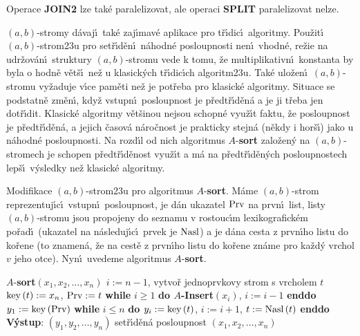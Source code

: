 \flushpar Operace {\bf JOIN2} lze tak\'e paralelizovat, ale operaci {\bf SPLIT  }
paralelizovat nelze.
\medskip

\flushpar$\left(a,b\right)$-stromy d\'avaj\'\i\ tak\'e zaj\'\i mav\'e aplikace pro 
t\v r\'\i dic\'\i\ 
algoritmy. Pou\v zit\'\i\ $\left(a,b\right)$-strom\accent23u pro set\v r\'\i d\v en\'\i\ 
n\'ahodn\'e posloupnosti nen\'\i\ vhodn\'e, re\v zie na udr\v zov\'an\'\i\ 
struktury $\left(a,b\right)$-stromu vede k tomu, \v ze multiplikativn\'\i\ 
konstanta by byla o hodn\v e v\v et\v s\'\i\ ne\v z u klasick\'ych 
t\v r\'\i dic\'\i ch algoritm\accent23u. Tak\'e ulo\v zen\'\i\ $\left(
a,b\right)$-stromu 
vy\v zaduje v\'\i ce pam\v eti ne\v z je pot\v reba pro klasick\'e 
algoritmy. Situace se podstatn\v e zm\v en\'\i , kdy\v z vstupn\'\i\ 
posloupnost je p\v red\-t\v r\'\i\-d\v en\'a a je ji t\v reba jen dot\v r\'\i dit. 
Klasick\'e algoritmy v\v et\v sinou nejsou schopn\'e vyu\v z\'\i t faktu, \v ze 
posloupnost je p\v redt\v r\'\i d\v en\'a, a jejich \v casov\'a n\'aro\v cnost je 
prakticky stejn\'a (n\v ekdy i hor\v s\'\i ) jako u n\'ahodn\'e 
posloupnosti. Na rozd\'\i l od nich algoritmus $A$-{\bf sort }
zalo\v zen\'y na $\left(a,b\right)$-stromech je schopen p\v redt\v r\'\i d\v enost 
vyu\v z\'\i t a m\'a na p\v redt\v r\'\i d\v en\'ych posloupnostech lep\v s\'\i\ 
v\'ysledky ne\v z klasick\'e algoritmy.
\medskip

\flushpar Modifikace $\left(a,b\right)$-strom\accent23u pro algoritmus 
$A$-{\bf sort}. M\'ame $\left(a,b\right)$-strom reprezentuj\'\i c\'\i\ vstupn\'\i\ 
posloupnost, je d\'an ukazatel $\operatorname{Prv}$ na prvn\'\i\ list, listy 
$\left(a,b\right)$-stromu jsou propojeny do seznamu v rostouc\'\i m 
lexikografick\'em po\v rad\'\i\ (ukazatel na n\'asleduj\'\i c\'\i\ prvek je 
$\operatorname{Nasl}$) a je d\'ana cesta z prvn\'\i ho listu do ko\v rene (to 
znamen\'a, \v ze na cest\v e z prvn\'\i ho listu do ko\v rene zn\'ame 
pro ka\v zd\'y vrchol $v$ jeho otce). Nyn\'\i\ uvedeme algoritmus 
$A$-{\bf sort}. 
\bigskip

$A$-{\bf sort$\left(x_1,x_2,\dots,x_n\right)$\newline 
$i:=n-1$}, vytvo\v r jednoprvkovy strom s vrcholem $t$\newline 
$\operatorname{key}\left(t\right):=x_n$, $\operatorname{Prv}:=t$\newline 
{\bf while} $i\ge 1$ {\bf do $A$-Insert$\left(x_i\right)$}, $i:=i-1$ {\bf enddo}\newline 
$y_1:=\operatorname{key}\left(\operatorname{Prv}\right)$\newline 
{\bf while} $i\le n$ {\bf do\newline 
\phantom{---}$y_i:=\operatorname{key}\left(t\right)$}, $i:=i+1$, $t:=\operatorname{Nasl}\left(t\right)$\newline 
{\bf enddo\newline 
V\'ystup}: $\left(y_1,y_2,\dots,y_n\right)$ set\v r\'\i d\v en\'a posloupnost $
\left(x_1,x_2,\dots,x_n\right)$
\medskip

